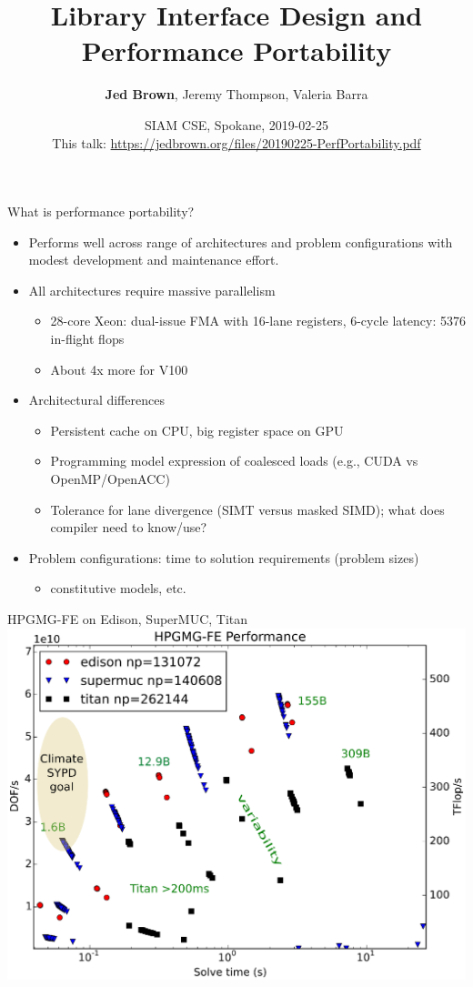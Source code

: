 \documentclass[aspectratio=1610]{beamer}
\title{Library Interface Design and Performance Portability}
\author{{\bf Jed Brown}, Jeremy Thompson, Valeria Barra}
\date{SIAM CSE, Spokane, 2019-02-25 \\[1em]
This talk: \url{https://jedbrown.org/files/20190225-PerfPortability.pdf}}
\begin{document}
\lstset{language=C}
\normalem

\begin{frame}
  \titlepage
\end{frame}

\begin{frame}{What is performance portability?}
  \begin{itemize}
  \item Performs well across range of architectures and problem configurations with modest development and maintenance effort.
  \item All architectures require massive parallelism
    \begin{itemize}
    \item 28-core Xeon: dual-issue FMA with 16-lane registers, 6-cycle latency: 5376 in-flight flops
    \item About 4x more for V100
    \end{itemize}
  \item Architectural differences
    \begin{itemize}
    \item Persistent cache on CPU, big register space on GPU
    \item Programming model expression of coalesced loads (e.g., CUDA vs OpenMP/OpenACC)
    \item Tolerance for lane divergence (SIMT versus masked SIMD); what does compiler need to know/use?
    \end{itemize}
  \item Problem configurations: time to solution requirements (problem sizes)
    \begin{itemize}
    \item constitutive models, etc.
    \end{itemize}
  \end{itemize}
\end{frame}

\begin{frame}{HPGMG-FE on Edison, SuperMUC, Titan}
  \includegraphics[width=.8\textwidth]{figures/hpgmg/range-edison-supermuc-titan-ann2.eps}
\end{frame}
\end{document}
